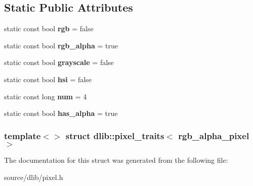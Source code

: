 \subsection*{Static Public Attributes}
\begin{DoxyCompactItemize}
\item 
\hypertarget{structdlib_1_1pixel__traits_3_01rgb__alpha__pixel_01_4_aed238eef6e9c1362eef1af6906251380}{
static const bool {\bfseries rgb} = false}
\label{structdlib_1_1pixel__traits_3_01rgb__alpha__pixel_01_4_aed238eef6e9c1362eef1af6906251380}

\item 
\hypertarget{structdlib_1_1pixel__traits_3_01rgb__alpha__pixel_01_4_abe68a247c056dee66bc1c430fd426430}{
static const bool {\bfseries rgb\_\-alpha} = true}
\label{structdlib_1_1pixel__traits_3_01rgb__alpha__pixel_01_4_abe68a247c056dee66bc1c430fd426430}

\item 
\hypertarget{structdlib_1_1pixel__traits_3_01rgb__alpha__pixel_01_4_af6817e9710ffb3bbd3ce83e05f9541cd}{
static const bool {\bfseries grayscale} = false}
\label{structdlib_1_1pixel__traits_3_01rgb__alpha__pixel_01_4_af6817e9710ffb3bbd3ce83e05f9541cd}

\item 
\hypertarget{structdlib_1_1pixel__traits_3_01rgb__alpha__pixel_01_4_ad4a92f9b421618c75432eef0aede06db}{
static const bool {\bfseries hsi} = false}
\label{structdlib_1_1pixel__traits_3_01rgb__alpha__pixel_01_4_ad4a92f9b421618c75432eef0aede06db}

\item 
\hypertarget{structdlib_1_1pixel__traits_3_01rgb__alpha__pixel_01_4_a440d908b0bb2621432309391ce81d6f7}{
static const long {\bfseries num} = 4}
\label{structdlib_1_1pixel__traits_3_01rgb__alpha__pixel_01_4_a440d908b0bb2621432309391ce81d6f7}

\item 
\hypertarget{structdlib_1_1pixel__traits_3_01rgb__alpha__pixel_01_4_ae5f039f49856a73a92eac77430c71b6e}{
static const bool {\bfseries has\_\-alpha} = true}
\label{structdlib_1_1pixel__traits_3_01rgb__alpha__pixel_01_4_ae5f039f49856a73a92eac77430c71b6e}

\end{DoxyCompactItemize}
\subsubsection*{template$<$$>$ struct dlib::pixel\_\-traits$<$ rgb\_\-alpha\_\-pixel $>$}



The documentation for this struct was generated from the following file:\begin{DoxyCompactItemize}
\item 
source/dlib/pixel.h\end{DoxyCompactItemize}
